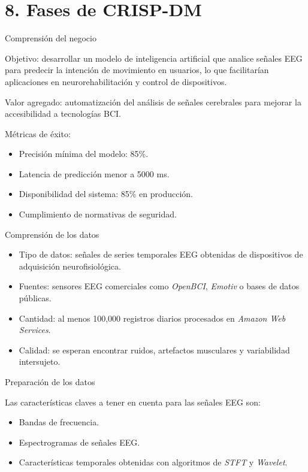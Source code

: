 \documentclass[
11pt, %
]{charter}
\begin{document}
\section{8. Fases de CRISP-DM}
\label{sec:entregables}

Comprensión del negocio

Objetivo: desarrollar un modelo de inteligencia artificial que analice señales EEG para predecir la intención de movimiento en usuarios, lo que facilitarían aplicaciones en neurorehabilitación y control de dispositivos.

Valor agregado: automatización del análisis de señales cerebrales para mejorar la accesibilidad a tecnologías BCI.

Métricas de éxito: 
\begin{itemize}
	\item Precisión mínima del modelo: 85\%.
	\item Latencia de predicción menor a 5000 ms.
	\item Disponibilidad del sistema: 85\% en producción.
	\item Cumplimiento de normativas de seguridad.
\end{itemize}

Comprensión de los datos

\begin{itemize}
	\item Tipo de datos: señales de series temporales EEG obtenidas de dispositivos de adquisición neurofisiológica.
	\item Fuentes: sensores EEG comerciales como \textit{OpenBCI}, \textit{Emotiv} o bases de datos públicas.
	\item Cantidad: al menos 100,000 registros diarios procesados en \textit{Amazon Web Services}.
	\item Calidad: se esperan encontrar ruidos, artefactos musculares y variabilidad intersujeto.
\end{itemize}

Preparación de los datos

Las características claves a tener en cuenta para las señales EEG son:

\begin{itemize}
	\item Bandas de frecuencia.
	\item Espectrogramas de señales EEG.
	\item Características temporales obtenidas con algoritmos de \textit{STFT} y \textit{Wavelet}.
\end{itemize}
\end{document}
